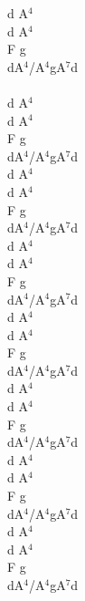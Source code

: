 \documentclass[a5paper, 10pt]{book}
\begin{document}
\begin{minipage}[t]{0.15\textwidth}
  d A$^4$\\
  d A$^4$\\
  F g\\
  dA$^4$/A$^4$gA$^7$d\\
  \\
  d A$^4$\\
  d A$^4$\\
  F g\\
  dA$^4$/A$^4$gA$^7$d\\

  d A$^4$\\
  d A$^4$\\
  F g\\
  dA$^4$/A$^4$gA$^7$d\\

  d A$^4$\\
  d A$^4$\\
  F g\\
  dA$^4$/A$^4$gA$^7$d\\

  d A$^4$\\
  d A$^4$\\
  F g\\
  dA$^4$/A$^4$gA$^7$d\\

  d A$^4$\\
  d A$^4$\\
  F g\\
  dA$^4$/A$^4$gA$^7$d\\

  d A$^4$\\
  d A$^4$\\
  F g\\
  dA$^4$/A$^4$gA$^7$d\\

  d A$^4$\\
  d A$^4$\\
  F g\\
  dA$^4$/A$^4$gA$^7$d\\
\end{minipage}

\newpage
\end{document}
